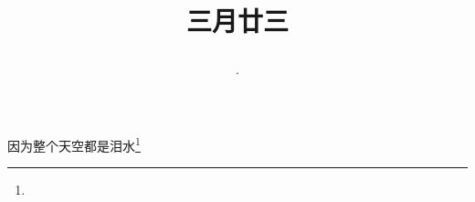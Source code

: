 \title{\date[d=1,m=5,y=2024][year:cn-y,年,month:cn,day:cn,日,·,weekday]·三月廿三 }
因为整个天空都是泪水\footnote{ }

